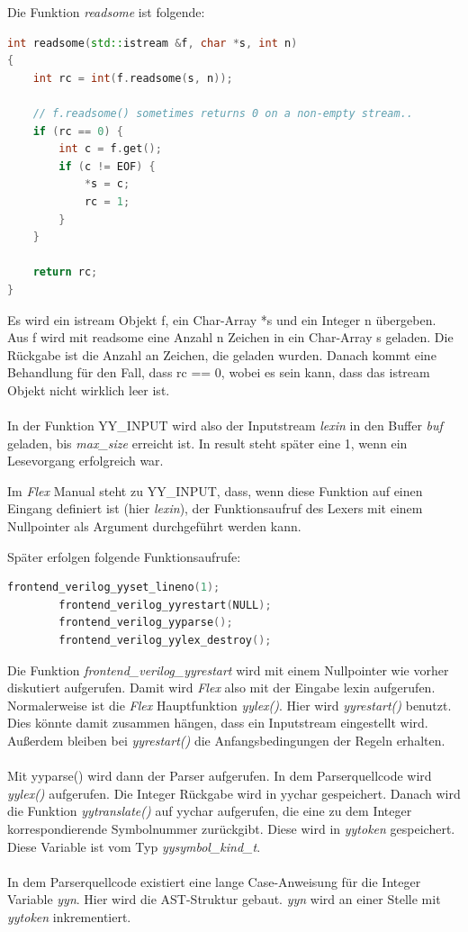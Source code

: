 \documentclass[11pt]{report}
\begin{document}
Die Funktion \textit{readsome} ist folgende:
\begin{lstlisting}[language=C++]
int readsome(std::istream &f, char *s, int n)
{
	int rc = int(f.readsome(s, n));

	// f.readsome() sometimes returns 0 on a non-empty stream..
	if (rc == 0) {
		int c = f.get();
		if (c != EOF) {
			*s = c;
			rc = 1;
		}
	}

	return rc;
}
\end{lstlisting}

Es wird ein istream Objekt f, ein Char-Array *s und ein Integer n übergeben.
Aus f wird mit readsome eine Anzahl n Zeichen in ein Char-Array s geladen. Die Rückgabe ist die Anzahl an Zeichen, die geladen wurden. Danach kommt eine Behandlung für den Fall, dass rc == 0, wobei es sein kann, dass das istream Objekt nicht wirklich leer ist.\\
\\
In der Funktion YY\_INPUT wird also der Inputstream \textit{lexin} in den Buffer \textit{buf} geladen, bis \textit{max\_size} erreicht ist.
In result steht später eine 1, wenn ein Lesevorgang erfolgreich war. 

Im \textit{Flex} Manual steht zu YY\_INPUT, dass, wenn diese Funktion auf einen Eingang definiert ist (hier \textit{lexin}), der Funktionsaufruf des Lexers mit einem Nullpointer als Argument durchgeführt werden kann.



Später erfolgen folgende Funktionsaufrufe:
\begin{lstlisting}[language=C++]
		frontend_verilog_yyset_lineno(1);
		frontend_verilog_yyrestart(NULL);
		frontend_verilog_yyparse();
		frontend_verilog_yylex_destroy();
\end{lstlisting}

Die Funktion \textit{frontend\_verilog\_yyrestart} wird mit einem Nullpointer wie vorher diskutiert aufgerufen. Damit wird \textit{Flex} also mit der Eingabe lexin aufgerufen.\\
Normalerweise ist die \textit{Flex} Hauptfunktion \textit{yylex()}.
Hier wird \textit{yyrestart()} benutzt. Dies könnte damit zusammen hängen, dass ein Inputstream eingestellt wird. Außerdem bleiben bei \textit{yyrestart()} die Anfangsbedingungen der Regeln erhalten.\\
\\
Mit yyparse() wird dann der Parser aufgerufen. In dem Parserquellcode wird \textit{yylex()} aufgerufen. Die Integer Rückgabe wird in yychar gespeichert. Danach wird die Funktion \textit{yytranslate()} auf yychar aufgerufen, die eine zu dem Integer korrespondierende Symbolnummer zurückgibt. Diese wird in \textit{yytoken} gespeichert. Diese Variable ist vom Typ \textit{yysymbol\_kind\_t}.
\\
\\
In dem Parserquellcode existiert eine lange Case-Anweisung für die Integer Variable \textit{yyn}. Hier wird die AST-Struktur gebaut. \textit{yyn} wird an einer Stelle mit \textit{yytoken} inkrementiert.
\end{document}
